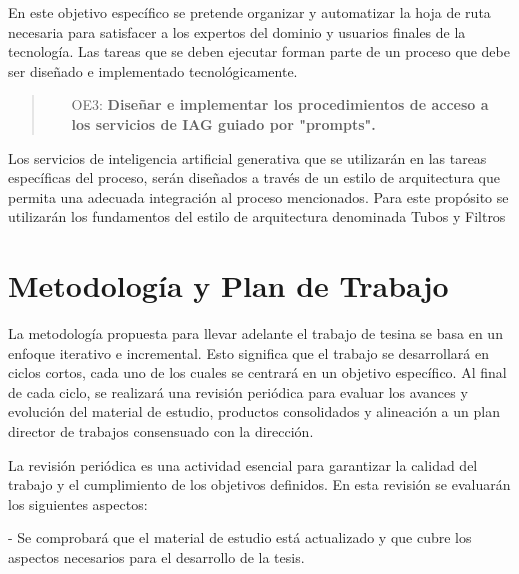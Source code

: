 \documentclass[12pt]{article}
\begin{document}
        \vspace{0.3 cm}

        En este objetivo específico se pretende organizar y automatizar la hoja de ruta necesaria para satisfacer a los expertos del dominio y usuarios finales de la tecnología. Las tareas que se deben ejecutar forman parte de un proceso que debe ser diseñado e implementado tecnológicamente.

        
        \vspace{0.3 cm}

        \begin{quote}
            \begin{itemize}
                    \item [OE3:] \textbf{Diseñar e implementar los procedimientos de acceso a los servicios de IAG guiado por "prompts".}
            \end{itemize}
        \end{quote}

        \vspace{0.3 cm}

        Los servicios de inteligencia artificial generativa que se utilizarán en las tareas específicas del proceso, serán diseñados a través de un estilo de arquitectura que permita una adecuada integración al proceso mencionados. Para este propósito se utilizarán los fundamentos del estilo de arquitectura denominada Tubos y Filtros \cite{land2002brief}
        

\section{Metodología y Plan de Trabajo}

La metodología propuesta para llevar adelante el trabajo de tesina se basa en un enfoque iterativo e incremental. Esto significa que el trabajo se desarrollará en ciclos cortos, cada uno de los cuales se centrará en un objetivo específico. Al final de cada ciclo, se realizará una revisión periódica para evaluar los avances y evolución del material de estudio, productos consolidados y alineación a un plan director de trabajos consensuado con la dirección.

La revisión periódica es una actividad esencial para garantizar la calidad del trabajo y el cumplimiento de los objetivos definidos. En esta revisión se evaluarán los siguientes aspectos:

- Se comprobará que el material de estudio está actualizado y que cubre los aspectos necesarios para el desarrollo de la tesis.
\end{document}
